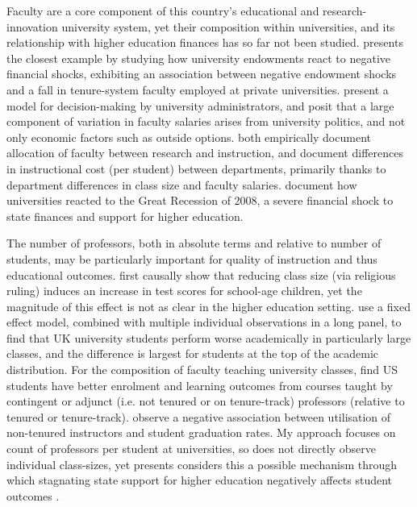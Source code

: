 Faculty are a core component of this country's educational and research-innovation university system, yet their composition within universities, and its relationship with higher education finances has so far not been studied.
\cite{brown2014endowment} presents the closest example by studying how university endowments react to negative financial shocks, exhibiting an association between negative endowment shocks and a fall in tenure-system faculty employed at private universities.
\cite{abe2015implications} present a model for decision-making by university administrators, and posit that a large component of variation in faculty salaries arises from university politics, and not only economic factors such as outside options.
\cite{johnson2009jep,NBERc13879} both empirically document allocation of faculty between research and instruction, and \cite{hemelt2021math} document differences in instructional cost (per student) between departments, primarily thanks to department differences in class size and faculty salaries.
\cite{turner2014impact} document how universities reacted to the Great Recession of 2008, a severe financial shock to state finances and support for higher education.

The number of professors, both in absolute terms and relative to number of students, may be particularly important for quality of instruction and thus educational outcomes.
\cite{angrist1999using} first causally show that reducing class size (via religious ruling) induces an increase in test scores for school-age children, yet the magnitude of this effect is not as clear in the higher education setting.
\cite{bandiera2010heterogeneous} use a fixed effect model, combined with multiple individual observations in a long panel, to find that UK university students perform worse academically in particularly large classes, and the difference is largest for students at the top of the academic distribution.
For the composition of faculty teaching university classes, \cite{bettinger2010does,figlio2015tenure} find US students have better enrolment and learning outcomes from courses taught by contingent or adjunct (i.e. not tenured or on tenure-track) professors (relative to tenured or tenure-track).
\cite{ehrenberg2005tenured} observe a negative association between utilisation of non-tenured instructors and student graduation rates.
My approach focuses on count of professors per student at universities, so does not directly observe individual class-sizes, yet presents considers this a possible mechanism through which stagnating state support for higher education negatively affects student outcomes \citep{NBERw23736,NBERw27885}.
